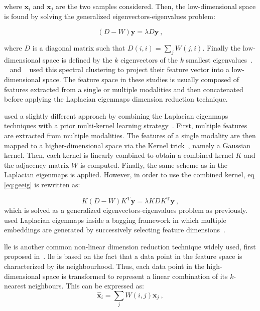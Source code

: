 \noindent where $\mathbf{x}_i$ and $\mathbf{x}_j$ are the two samples considered.
Then, the low-dimensional space is found by solving the generalized eigenvectors-eigenvalues problem:

\begin{equation}
	(D-W)\mathbf{y} = \lambda D \mathbf{y} \ ,
	\label{eq:geeig}
\end{equation}

\noindent where $D$ is a diagonal matrix such that $D(i,i) = \sum_j W(j,i)$.
Finally the low-dimensional space is defined by the $k$ eigenvectors of the $k$ smallest eigenvalues~\cite{Belkin2001}.
\citeauthor{Tiwari2009a}~\cite{Tiwari2007,Tiwari2009,Tiwari2009a} and \citeauthor{Viswanath2008}~\cite{Viswanath2008} used this spectral clustering to project their feature vector into a low-dimensional space.
The feature space in these studies is usually composed of features extracted from a single or multiple modalities and then concatenated before applying the Laplacian eigenmaps dimension reduction technique.

\citeauthor{Tiwari2013} used a slightly different approach by combining the Laplacian eigenmaps techniques with a prior multi-kernel learning strategy~\cite{Tiwari2009,Tiwari2013}.
First, multiple features are extracted from multiple modalities.
The features of a single modality are then mapped to a higher-dimensional space via the Kernel trick~\cite{Aizerman1964}, namely a Gaussian kernel.
Then, each kernel is linearly combined to obtain a combined kernel $K$ and the adjacency matrix $W$ is computed.
Finally, the same scheme as in the Laplacian eigenmaps is applied.
However, in order to use the combined kernel, \acs{eq}\,\eqref{eq:geeig} is rewritten as:

\begin{equation}
  K (D-W) K^{\text{T}} \mathbf{y} = \lambda K D K^{\text{T}} \mathbf{y} \ ,
  \label{eq:sesmik}
\end{equation}
\noindent which is solved as a generalized eigenvectors-eigenvalues problem as previously.
\citeauthor{Viswanath2011} used Laplacian eigenmaps inside a bagging framework in which multiple embeddings are generated by successively selecting feature dimensions~\cite{Viswanath2011}.

\Ac{lle} is another common non-linear dimension reduction technique widely used, first proposed in~\cite{Roweis2000}.
\ac{lle} is based on the fact that a data point in the feature space is characterized by its neighbourhood.
Thus, each data point in the high-dimensional space is transformed to represent a linear combination of its $k$-nearest neighbours.
This can be expressed as:
\begin{equation}
	\hat{\mathbf{x}}_i = \sum_j W(i,j) \mathbf{x}_j \ ,
	\label{eq:lincomlle}
\end{equation}

